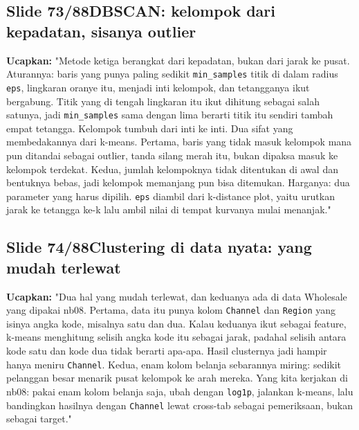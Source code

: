 \documentclass[11pt]{article}
\renewcommand{\framebox}[1]{\colorbox{acc!15}{\textcolor{acc}{\textbf{#1}}}}
\begin{document}
\subsection*{\framebox{Slide 73/88}\quad DBSCAN: kelompok dari kepadatan, sisanya outlier}
\textbf{Ucapkan:} "Metode ketiga berangkat dari kepadatan, bukan dari jarak ke pusat. Aturannya: baris yang punya paling sedikit \texttt{min\_samples} titik di dalam radius \texttt{eps}, lingkaran oranye itu, menjadi inti kelompok, dan tetangganya ikut bergabung. Titik yang di tengah lingkaran itu ikut dihitung sebagai salah satunya, jadi \texttt{min\_samples} sama dengan lima berarti titik itu sendiri tambah empat tetangga. Kelompok tumbuh dari inti ke inti. Dua sifat yang membedakannya dari k-means. Pertama, baris yang tidak masuk kelompok mana pun ditandai sebagai outlier, tanda silang merah itu, bukan dipaksa masuk ke kelompok terdekat. Kedua, jumlah kelompoknya tidak ditentukan di awal dan bentuknya bebas, jadi kelompok memanjang pun bisa ditemukan. Harganya: dua parameter yang harus dipilih. \texttt{eps} diambil dari k-distance plot, yaitu urutkan jarak ke tetangga ke-k lalu ambil nilai di tempat kurvanya mulai menanjak."\\[2pt]

\subsection*{\framebox{Slide 74/88}\quad Clustering di data nyata: yang mudah terlewat}
\textbf{Ucapkan:} "Dua hal yang mudah terlewat, dan keduanya ada di data Wholesale yang dipakai nb08. Pertama, data itu punya kolom \texttt{Channel} dan \texttt{Region} yang isinya angka kode, misalnya satu dan dua. Kalau keduanya ikut sebagai feature, k-means menghitung selisih angka kode itu sebagai jarak, padahal selisih antara kode satu dan kode dua tidak berarti apa-apa. Hasil clusternya jadi hampir hanya meniru \texttt{Channel}. Kedua, enam kolom belanja sebarannya miring: sedikit pelanggan besar menarik pusat kelompok ke arah mereka. Yang kita kerjakan di nb08: pakai enam kolom belanja saja, ubah dengan \texttt{log1p}, jalankan k-means, lalu bandingkan hasilnya dengan \texttt{Channel} lewat cross-tab sebagai pemeriksaan, bukan sebagai target."\\[2pt]
\end{document}
